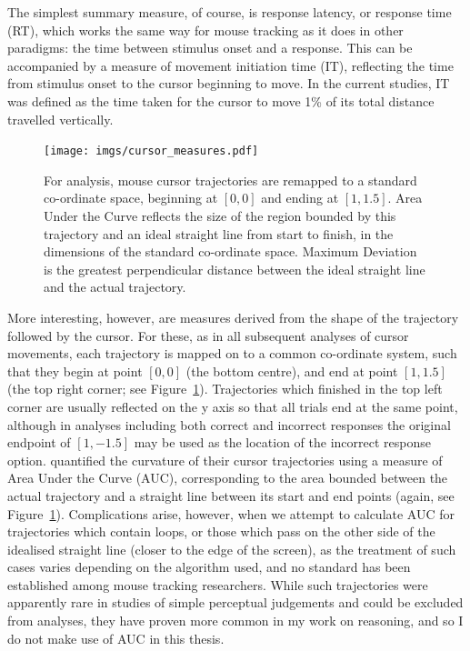 The simplest summary measure, of course, is response latency, or response time (RT),
which works the same way for mouse tracking
as it does in other paradigms:
the time between stimulus onset and a response.
This can be accompanied by a measure of movement initiation time (IT),
reflecting the time from stimulus onset
to the cursor beginning to move.
In the current studies, IT was defined as the time taken
for the cursor to move 1\% of its total distance travelled vertically.

\begin{figure}[ht]
  \centering
  \texttt{[image: imgs/cursor\_measures.pdf]}
  \caption[Summary measures for cursor trajectories.]{
    \label{fig:cursor_measures}
    For analysis, mouse cursor trajectories are remapped to a standard co-ordinate space,
    beginning at $[0,0]$ and ending at $[1,1.5]$.
    Area Under the Curve reflects the size of the region bounded by this trajectory
    and an ideal straight line from start to finish,
    in the dimensions of the standard co-ordinate space.
    Maximum Deviation is the greatest perpendicular distance
    between the ideal straight line
    and the actual trajectory.
  }
\end{figure}


More interesting, however, are measures derived from
the shape of the trajectory followed by the cursor.
For these, as in all subsequent analyses of cursor movements,
each trajectory is mapped on to a common co-ordinate system,
such that they begin at point $[0,0]$ (the bottom centre),
and end at point $[1,1.5]$ (the top right corner;
see Figure~\ref{fig:cursor_measures}).
Trajectories which finished in the top left corner
are usually reflected on the y axis 
so that all trials end at the same point,
although in analyses including both correct and incorrect responses
the original endpoint of $[1,-1.5]$ may be used as 
the location of the incorrect response option.
\citet{Spivey2005} quantified the curvature of their cursor trajectories
using a measure of Area Under the Curve (AUC),
corresponding to the area bounded between the actual trajectory
and a straight line between its start and end points
(again, see Figure~\ref{fig:cursor_measures}).
Complications arise, however,
when we attempt to calculate AUC for trajectories which contain loops,
or those which pass on the other side of the idealised straight line
(closer to the edge of the screen),
as the treatment of such cases varies depending on the algorithm used,
and no standard has been established among mouse tracking researchers.
While such trajectories were apparently rare
in studies of simple perceptual judgements
and could be excluded from analyses,
they have proven more common in my work on reasoning,
and so I do not make use of AUC in this thesis.

